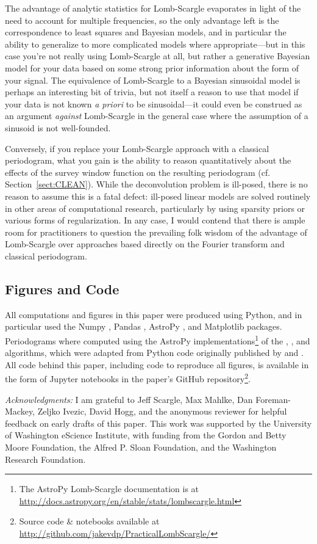 \documentclass[preprint]{aastex}
\newcommand{\Sect}[1]{Section~\ref{sect:#1}}
\newcommand{\sect}[1]{\Sect{#1}}
\begin{document}
The advantage of analytic statistics for Lomb-Scargle evaporates in light of the
need to account for multiple frequencies, so the only advantage left is the
correspondence to least squares and Bayesian models, and in particular the
ability to generalize to more complicated models where appropriate---but in
this case you're not really using Lomb-Scargle at all,
but rather a generative Bayesian model for your
data based on some strong prior information about the form of your signal.
The equivalence of Lomb-Scargle to a Bayesian sinusoidal model is perhaps
an interesting bit of trivia, but not itself a reason to use that model if your
data is not known {\it a priori} to be sinusoidal---it could even be construed as
an argument {\it against} Lomb-Scargle in the general case where the assumption
of a sinusoid is not well-founded.

Conversely, if you replace your Lomb-Scargle approach with a classical periodogram,
what you gain is the ability to reason quantitatively about the effects of the
survey window function on the resulting periodogram (cf. \sect{CLEAN}).
While the deconvolution problem is ill-posed, there is no reason to assume
this is a fatal defect: ill-posed linear models are solved routinely in
other areas of computational research, particularly by using sparsity
priors or various forms of regularization.
In any case, I would contend that there is ample room for practitioners to
question the prevailing folk wisdom of the advantage of Lomb-Scargle
over approaches based directly on the Fourier transform and classical
periodogram.

\subsection{Figures and Code}

All computations and figures in this paper were produced using Python,
and in particular used the
Numpy \citep{numpy, numpybook},
Pandas \citep{pandas},
AstroPy \citep{Astropy2013},
and Matplotlib \citep{matplotlib} packages.
Periodograms where computed using the
AstroPy implementations\footnote{The AstroPy Lomb-Scargle documentation is at
\url{http://docs.astropy.org/en/stable/stats/lombscargle.html}}
of the \citet{Press89}, \citet{Zechmeister09}, and
\citet{Palmer09} algorithms, which were adapted from Python code originally
published by \citet{ICVG2014} and \citet{VanderPlas2015}.
All code behind this paper, including code to reproduce all figures,
is available in the form of Jupyter notebooks in the paper's GitHub
repository\footnote{Source code \& notebooks available at
\url{http://github.com/jakevdp/PracticalLombScargle/}}.

\acknowledgments
{\it Acknowledgments:} I am grateful to Jeff Scargle, Max Mahlke, Dan
Foreman-Mackey, Zeljko Ivezic, David Hogg, and the anonymous reviewer
for helpful feedback on early drafts of this paper.
This work was supported by the University of Washington eScience Institute,
with funding from the Gordon and Betty Moore Foundation, the Alfred P. Sloan
Foundation, and the Washington Research Foundation.



\end{document}
